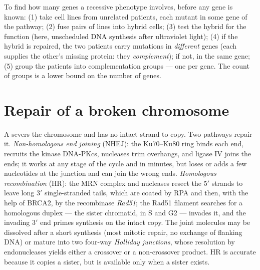 \begin{method}\label{met:b3:dna-repair:complementation}
To find how many genes a recessive phenotype involves, before any gene
is known: (1) take cell lines from unrelated patients, each mutant in
some gene of the pathway; (2) fuse pairs of lines into hybrid cells;
(3) test the hybrid for the function (here, unscheduled DNA synthesis
after ultraviolet light); (4) if the hybrid is repaired, the two
patients carry mutations in \emph{different} genes (each supplies the
other's missing protein: they \emph{complement}); if not, in the same
gene; (5) group the patients into complementation groups --- one per
gene. The count of groups is a lower bound on the number of genes.
\end{method}

\section{Repair of a broken chromosome}

\begin{definition}\label{def:b3:dna-repair:dsb}
A \emph{} severs the chromosome and has no intact
strand to copy. Two pathways repair it. \emph{Non-homologous end
joining} (NHEJ): the Ku70--Ku80 ring binds each end, recruits the
kinase DNA-PKcs, nucleases trim overhangs, and ligase IV joins the
ends; it works at any stage of the cycle and in minutes, but loses or
adds a few nucleotides at the junction and can join the wrong ends.
\emph{Homologous recombination} (HR): the MRN complex and nucleases
resect the 5$'$ strands to leave long 3$'$ single-stranded tails,
which are coated by RPA and then, with the help of BRCA2, by the
recombinase \emph{Rad51}; the Rad51 filament searches for a homologous
duplex --- the sister chromatid, in S and G2 --- invades it, and the
invading 3$'$ end primes synthesis on the intact copy. The joint
molecules may be dissolved after a short synthesis (most mitotic
repair, no exchange of flanking DNA) or mature into two four-way
\emph{Holliday junctions}, whose resolution by endonucleases yields
either a crossover or a non-crossover product. HR is accurate because
it copies a sister, but is available only when a sister exists.
\end{definition}

